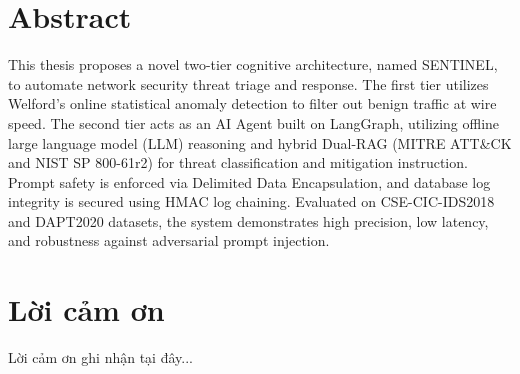 \documentclass[12pt,a4paper]{report}
\begin{document}
\pagestyle{fancy}
\setcounter{page}{3} %

\chapter*{Abstract}
\begin{singlespace} %
This thesis proposes a novel two-tier cognitive architecture, named SENTINEL, to automate network security threat triage and response. The first tier utilizes Welford's online statistical anomaly detection to filter out benign traffic at wire speed. The second tier acts as an AI Agent built on LangGraph, utilizing offline large language model (LLM) reasoning and hybrid Dual-RAG (MITRE ATT\&CK and NIST SP 800-61r2) for threat classification and mitigation instruction. Prompt safety is enforced via Delimited Data Encapsulation, and database log integrity is secured using HMAC log chaining. Evaluated on CSE-CIC-IDS2018 and DAPT2020 datasets, the system demonstrates high precision, low latency, and robustness against adversarial prompt injection.
\end{singlespace}

\chapter*{Lời cảm ơn}
Lời cảm ơn ghi nhận tại đây...

\tableofcontents
\listoftables
\listoffigures

\newpage
{}
\setcounter{page}{1} %
\doublespacing %







\end{document}
